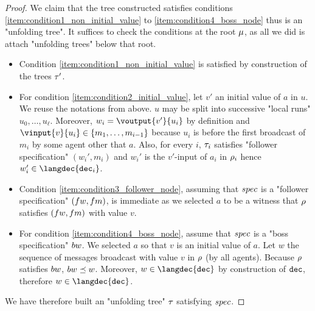 \begin{proof}
	We claim that the tree constructed satisfies conditions \ref{item:condition1_non_initial_value} to \ref{item:condition4_boss_node} thus is an "unfolding tree". It suffices to check the conditions at the root $\mu$, as all we did is attach "unfolding trees" below that root. 
	\begin{itemize}
	\item Condition \ref{item:condition1_non_initial_value} is satisfied by construction of the trees $\tau'$.
	\item For condition \ref{item:condition2_initial_value}, let $v'$ an initial value of $a$ in $u$. We reuse the notations from above. $u$ may be split into successive "local runs" $u_0, \dots, u_\ell$. Moreover, $w_i  = \voutput{v'}{u_i}$ by definition and $\vinput{v}{u_i} \in \set{m_1,\dots,m_{i-1}}$ because $u_i$ is before the first broadcast of $m_i$ by some agent other that $a$. Also, for every $i$, $\tau_i$ satisfies "follower specification" $(w_i',m_i)$ and $w_i'$ is the $v'$-input of $a_i$ in $\rho_i$ hence $w_i' \in \langdec{\decsymb_i}$.
	\item Condition \ref{item:condition3_follower_node}, assuming that $\spec$ is a "follower specification" $(\followwordspec, \followmessagespec)$, is immediate as we selected $a$  to be a witness that $\rho$ satisfies $(\followwordspec, \followmessagespec)$ with value $v$. 
	\item For condition \ref{item:condition4_boss_node}, assume that $\spec$ is a "boss specification" $\bossspec$. We selected $a$ so that $v$ is an initial value of $a$. Let $w$ the sequence of messages broadcast with value $v$ in $\rho$ (by all agents). 
	Because $\rho$ satisfies $\bossspec$, $\bossspec \subword w$. Moreover, $w \in \langdec{\decsymb}$ by construction of $\mathtt{dec}$, therefore $w \in \langdec{\decsymb}$.
	\end{itemize}

	We have therefore built an "unfolding tree" $\tau$ satisfying $\spec$. 
\end{proof}
